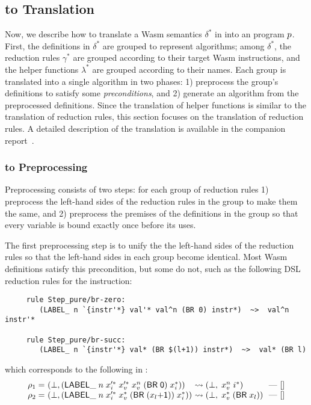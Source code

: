 \subsection{\dl to \al Translation}\label{sec:dl2al}
Now, we describe how to translate a Wasm semantics $\delta^*$ in \dl into an \al program $p$.
First, the definitions in $\delta^*$ are grouped to represent algorithms; among $\delta^*$,
the reduction rules $\gamma^*$ are grouped according to their target Wasm instructions, and
the helper functions $\lambda^*$ are grouped according to their names.
Each group is translated into a single algorithm in two phases:
1) preprocess the group's definitions to satisfy some \textit{preconditions}, and
2) generate an \al algorithm from the preprocessed \dl definitions.
Since the translation of helper functions is similar to the translation of reduction rules,
this section focuses on the translation of reduction rules.
A detailed description of the translation is available in the companion report~\cite{il-tr}.

\subsubsection{\dl to \dl Preprocessing}
Preprocessing consists of two steps: for each group of reduction rules
1) preprocess the left-hand sides of the reduction rules
in the group to make them the same, and
2) preprocess the premises of the definitions in the group
so that every variable is bound exactly once before its uses.

\medskip
The first preprocessing step is to unify the the left-hand sides of
the reduction rules so that the left-hand sides in each group become identical.
Most Wasm definitions satisfy this precondition, but some do not, such as the following
DSL reduction rules for the  instruction:

{
\begin{verbatim}
     rule Step_pure/br-zero:
        (LABEL_ n `{instr'*} val'* val^n (BR 0) instr*)  ~>  val^n instr'*

     rule Step_pure/br-succ:
        (LABEL_ n `{instr'*} val* (BR $(l+1)) instr*)  ~>  val* (BR l)
\end{verbatim}
}

\noindent
which corresponds to the following in \dl:
\[
\begin{array}{l@{~}l@{~}l@{~}l}
\rho_1 = &(\bot, (\ssf{LABEL\_} \; n \; x_i'^*\; x_v'^*\; x_v^{n}\; (\ssf{BR\; 0})\; x_i^*)) &\leadsto
 (\bot,\; x_v^{n}\; i^*)\ & \mbox{---}\ []\\
\rho_2 = &(\bot, (\ssf{LABEL\_} \; n \; x_i'^*\; x_v^*\; (\ssf{BR\; (}x_l\ssf{+1)})\; x_i^*)) &\leadsto
 (\bot,\; x_v^*\; (\ssf{BR}\; x_l))\ & \mbox{---}\ []
\end{array}
\]

